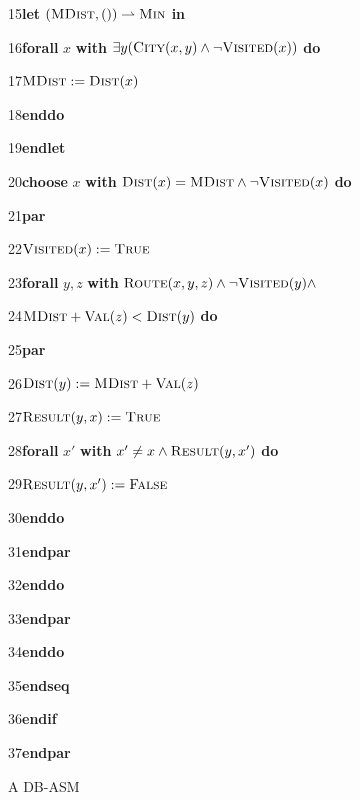 \documentclass[preprint,11pt]{elsarticle}
\theoremstyle{definition}
\theoremstyle{remark}
\begin{document}
\begin{figure}[!ht]
15\hspace{1.55cm}\textbf{let} $(\textsc{MDist},()) \rightharpoonup \textsc{Min}$ \textbf{in}

16\hspace{2.05cm}\textbf{forall} $x$ \textbf{with} $\exists y ( \textsc{City}(x,y) \wedge \neg \textsc{Visited}(x))$ \textbf{do}

17\hspace{2.55cm}$\textsc{MDist} := \textsc{Dist}(x)$

18\hspace{2.05cm}\textbf{enddo}

19\hspace{1.55cm}\textbf{endlet}

20\hspace{1.55cm}\textbf{choose} $x$ \textbf{with} $\textsc{Dist}(x)=\textsc{MDist} \wedge \neg \textsc{Visited}(x)$ \textbf{do}

21\hspace{2.05cm}\textbf{par}

22\hspace{2.55cm}$\textsc{Visited}(x) := \textsc{True}$

23\hspace{2.55cm}\textbf{forall} $y, z$ \textbf{with} $\textsc{Route}(x,y,z) \wedge \neg \textsc{Visited}(y) \wedge$

24\hspace{5.1cm}$\textsc{MDist}+\textsc{Val}(z) < \textsc{Dist}(y)$ \textbf{do}

25\hspace{3.05cm}\textbf{par}

26\hspace{3.55cm}$\textsc{Dist}(y) := \textsc{MDist}+\textsc{Val}(z)$

27\hspace{3.55cm}$\textsc{Result}(y,x) := \textsc{True}$

28\hspace{3.55cm}\textbf{forall} $x'$ \textbf{with} $x' \neq x \wedge \textsc{Result}(y,x')$ \textbf{do}

29\hspace{4.05cm}$\textsc{Result}(y,x') := \textsc{False}$

30\hspace{3.55cm}\textbf{enddo}

31\hspace{3.05cm}\textbf{endpar}

32\hspace{2.55cm}\textbf{enddo}

33\hspace{2.05cm}\textbf{endpar}

34\hspace{1.55cm}\textbf{enddo}

35\hspace{1.05cm}\textbf{endseq}

36\hspace{0.55cm}\textbf{endif}

37\hspace{0.1cm}\textbf{endpar}
\caption{A DB-ASM}
\label{exa:DBASM-code}
\end{figure}
\end{document}
